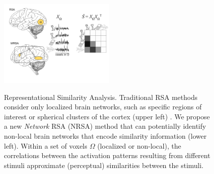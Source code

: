 \begin{figure}[!h]
	\centering
	          \includegraphics[width=0.5\textwidth]{figures/WRSA.pdf} \\
	        
	\caption{Representational Similarity Analysis.  Traditional RSA methods consider only localized brain networks, such as specific regions of interest or spherical clusters of the cortex (upper left) \cite{RSA,searchlight}.  We propose a new {\em Network} RSA (NRSA) method that can potentially identify non-local brain networks that encode similarity information (lower left).  Within a set of voxels $\Omega$ (localized or non-local), the correlations between the activation patterns resulting from different stimuli approximate (perceptual) similarities between the stimuli.  } \label{Fig:WRSA}
	\label{fig.fitting}
\end{figure}



